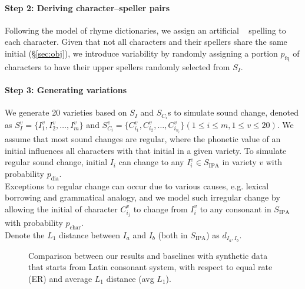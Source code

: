 \paragraph{Step 2: Deriving character--speller pairs} 
Following the model of rhyme dictionaries, we assign an artificial \fq~ spelling to each character. 
Given that not all characters and their spellers share the same initial (\S\ref{sec:obj}), we introduce variability by randomly assigning a portion $p_{\text{fq}}$ of characters to have their upper spellers randomly selected from $S_I$.


\paragraph{Step 3: Generating variations} 
We generate 20 varieties based on $S_I$ and $S_{C_i}$s to simulate sound change, denoted as $S_I^v=\{I_1^v, I_2^v, \dots, I_m^v\}$ and $S_{C_i}^v=\{C_{i_1}^v, C_{i_2}^v, \dots, C_{i_{n_i}}^v\} (1\leq i \leq m, 1\leq v \leq 20)$.
We assume that most sound changes are regular, where the phonetic value of an initial influences all characters with that initial in a given variety. To simulate regular sound change, initial $I_i$ can change to any $I_i^v \in S_\text{IPA}$ in variety $v$ with probability $p_\text{dia}$.\\
Exceptions to regular change can occur due to various causes, e.g. lexical borrowing and grammatical analogy, and we model such irregular change by allowing the initial of character $C_{i_j}^v$ to change from $I_i^v$ to any consonant in $S_\text{IPA}$ with probability $p_\text{char}$.\\
Denote the $L_1$ distance between $I_a$ and $I_b$ (both in $S_\text{IPA}$) as $d_{I_a, I_b}$.

\begin{figure*}[t!]
  \centering
    \caption{Comparison between our results and baselines with synthetic data that starts from Latin consonant system, with respect to equal rate (ER) and average $L_1$ distance (avg $L_1$).}
  \label{Fig:baseline-Latin}
\end{figure*}

